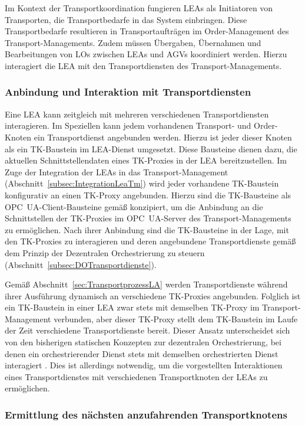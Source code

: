 Im Kontext der Transportkoordination fungieren LEAs als Initiatoren von Transporten, die Transportbedarfe in das System einbringen. Diese Transportbedarfe resultieren in Transportaufträgen im Order-Management des Transport-Managements. Zudem müssen Übergaben, Übernahmen und Bearbeitungen von LOs zwischen LEAs und AGVs koordiniert werden. Hierzu interagiert die LEA mit den Transportdiensten des Transport-Managements.

\subsubsection{Anbindung und Interaktion mit Transportdiensten}

Eine LEA kann zeitgleich mit mehreren verschiedenen Transportdiensten interagieren. Im Speziellen kann jedem vorhandenen Transport- und Order-Knoten ein Transportdienst angebunden werden. Hierzu ist jeder dieser Knoten als ein TK-Baustein im LEA-Dienst umgesetzt. Diese Bausteine dienen dazu, die aktuellen Schnittstellendaten eines TK-Proxies in der LEA bereitzustellen. Im Zuge der Integration der LEAs in das Transport-Management (Abschnitt~\ref{subsec:IntegrationLeaTm}) wird jeder vorhandene TK-Baustein konfigurativ an einen TK-Proxy angebunden. Hierzu sind die TK-Bausteine als OPC~UA-Client-Bausteine gemäß \cite{OPCFoundation.30001} konzipiert, um die Anbindung an die Schnittstellen der TK-Proxies im OPC~UA-Server des Transport-Managements zu ermöglichen. Nach ihrer Anbindung sind die TK-Bausteine in der Lage, mit den TK-Proxies zu interagieren und deren angebundene Transportdienste gemäß dem Prinzip der Dezentralen Orchestrierung zu steuern (Abschnitt~\ref{subsec:DOTransportdienste}). 

Gemäß Abschnitt~\ref{sec:TransportprozessLA} werden Transportdienste während ihrer Ausführung dynamisch an verschiedene TK-Proxies angebunden. Folglich ist ein TK-Baustein in einer LEA zwar stets mit demselben TK-Proxy im Transport-Management verbunden, aber dieser TK-Proxy stellt dem TK-Baustein im Laufe der Zeit verschiedene Transportdienste bereit. Dieser Ansatz unterscheidet sich von den bisherigen statischen Konzepten zur dezentralen Orchestrierung, bei denen ein orchestrierender Dienst stets mit demselben orchestrierten Dienst interagiert \cite{Spaethe.2019,Stutz.SubelServices}. Dies ist allerdings notwendig, um die vorgestellten Interaktionen eines Transportdienstes mit verschiedenen Transportknoten der LEAs zu ermöglichen.

\subsubsection{Ermittlung des nächsten anzufahrenden Transportknotens}


